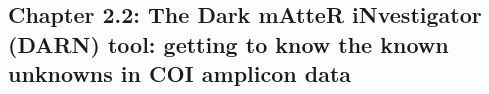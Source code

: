 \documentclass{beamer}
\begin{document}
            

         








   \begin{darkframes}
      \subsection{\textbf{Chapter 2.2}: The Dark mAtteR iNvestigator (DARN) tool: getting to know
      the known unknowns in COI amplicon data}
   \end{darkframes}
   
\end{document}
